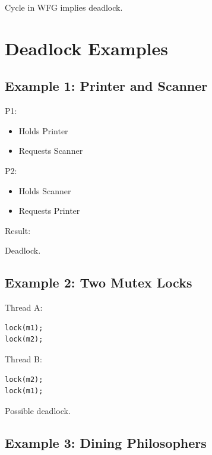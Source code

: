 Cycle in WFG implies deadlock.

\section{Deadlock Examples}

\subsection{Example 1: Printer and Scanner}

P1:

\begin{itemize}
\item Holds Printer
\item Requests Scanner
\end{itemize}

P2:

\begin{itemize}
\item Holds Scanner
\item Requests Printer
\end{itemize}

Result:

Deadlock.

\subsection{Example 2: Two Mutex Locks}

Thread A:

\begin{verbatim}
lock(m1);
lock(m2);
\end{verbatim}

Thread B:

\begin{verbatim}
lock(m2);
lock(m1);
\end{verbatim}

Possible deadlock.

\subsection{Example 3: Dining Philosophers}

